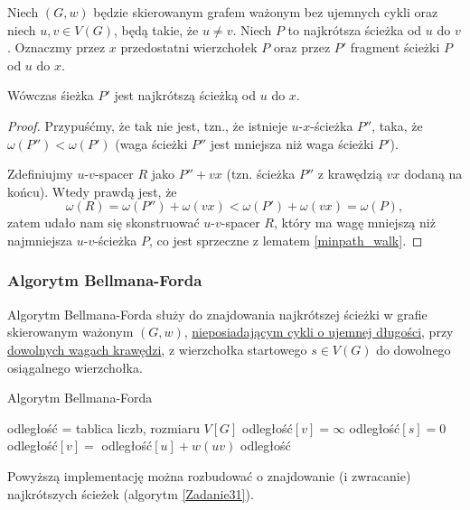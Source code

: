 \begin{lemma}
	Niech $(G, w)$ będzie skierowanym grafem ważonym
	bez ujemnych cykli oraz niech $u, v \in V(G)$,
	będą takie, że $u \not = v$. Niech $P$ to 
	najkrótsza ścieżka od $u$ do $v$. Oznaczmy przez
	$x$ przedostatni wierzchołek $P$ oraz 
	przez $P'$ fragment ścieżki $P$ od $u$ do $x$.
	
	Wówczas śieżka $P'$ jest najkrótszą ścieżką od $u$ do 
	$x$.
	
	\begin{proof}
		Przypuśćmy, że tak nie jest, tzn., że istnieje 
		$u$-$x$-ścieżka $P''$, taka, że 
		$\omega(P'') < \omega(P')$ (waga ścieżki $P''$
		jest mniejsza niż waga ścieżki $P'$).
		
		Zdefiniujmy $u$-$v$-spacer $R$ jako $P'' + vx$
		(tzn. ścieżka $P''$ z krawędzią $vx$ 
		dodaną na końcu). Wtedy prawdą jest, że
		\[\omega(R) = \omega(P'') + \omega(vx) <
		\omega(P') + \omega(vx) = \omega(P),\]
		zatem udało nam się skonstruować 
		$u$-$v$-spacer $R$, który ma wagę mniejszą niż
		najmniejsza $u$-$v$-ścieżka $P$, co 
		jest sprzeczne z lematem \ref{minpath_walk}.
	\end{proof}
	\label{minpath_subpath}
\end{lemma}
\subsubsection{Algorytm Bellmana-Forda}
Algorytm Bellmana-Forda służy do znajdowania 
najkrótszej ścieżki w grafie skierowanym ważonym $(G, w)$,
\ul{nieposiadającym cykli o ujemnej długości}, przy 
\ul{dowolnych wagach krawędzi}, %
z wierzchołka startowego $s \in V(G)$
do dowolnego osiągalnego wierzchołka.

\begin{algorithm}[H]
	\caption{Algorytm Bellmana-Forda}\label{bellmanford_alg}
	\begin{algorithmic}[1]
		\State odległość = tablica liczb, rozmiaru $V[G]$
		\State odległość$[v]=\infty$
		\EndFor
		\State odległość$[s]=0$
		\State odległość$[v]=$ odległość$[u] + w(uv)$ 
		\EndIf
		\EndFor
		\EndFor
		\State \Return odległość
		\EndProcedure
	\end{algorithmic}
	\label{bellman_ford}
\end{algorithm}
Powyższą implementację można rozbudować o
znajdowanie (i zwracanie) najkrótszych ścieżek
(algorytm \ref{Zadanie31}).

